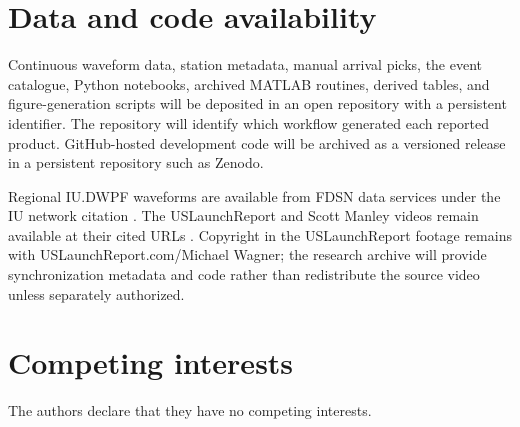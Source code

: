 \documentclass[]{seismica}
\begin{document}
\section*{Data and code availability}

Continuous waveform data, station metadata, manual arrival picks, the event catalogue, Python notebooks, archived MATLAB routines, derived tables, and figure-generation scripts will be deposited in an open repository with a persistent identifier. The repository will identify which workflow generated each reported product. GitHub-hosted development code will be archived as a versioned release in a persistent repository such as Zenodo.

Regional IU.DWPF waveforms are available from FDSN data services under the IU
network citation \citep{asl_gsn_iu_1988}. The USLaunchReport and Scott Manley
videos remain available at their cited URLs
\citep{uslaunchreport_amos6_video_2016,manley_spacex_explosion_2016}. Copyright
in the USLaunchReport footage remains with USLaunchReport.com/Michael Wagner;
the research archive will provide synchronization metadata and code rather
than redistribute the source video unless separately authorized.

\section*{Competing interests}

The authors declare that they have no competing interests.


\end{document}
